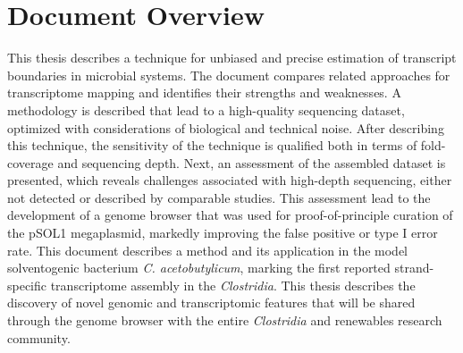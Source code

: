\section{Document Overview}
This thesis describes a technique for unbiased and precise estimation of transcript boundaries in microbial systems. The document compares related approaches for transcriptome mapping and identifies their strengths and weaknesses. A methodology is described that lead to a high-quality sequencing dataset, optimized with considerations of biological and technical noise. After describing this technique, the sensitivity of the technique is qualified both in terms of fold-coverage and sequencing depth. Next, an assessment of the assembled dataset is presented, which reveals challenges associated with high-depth sequencing, either not detected or described by comparable studies. This assessment lead to the development of a genome browser that was used for proof-of-principle curation of the pSOL1 megaplasmid, markedly improving the false positive or type I error rate. This document describes a method and its application in the model solventogenic bacterium \textit{C. acetobutylicum}, marking the first reported strand-specific transcriptome assembly in the \textit{Clostridia}. This thesis describes the discovery of novel genomic and transcriptomic features that will be shared through the genome browser with the entire \textit{Clostridia} and renewables research community. 